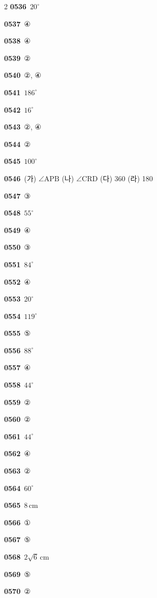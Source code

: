 \documentclass[10pt,a4paper]{article}
\newcommand{\pt}[1]{\mathrm{#1}}
\begin{document}
\begin{multicols}{2}
\noindent\textbf{0536}\ $20^\circ$\par
\noindent\textbf{0537}\ ④\par
\noindent\textbf{0538}\ ④\par
\noindent\textbf{0539}\ ②\par
\noindent\textbf{0540}\ ②, ④\par
\noindent\textbf{0541}\ $186^\circ$\par
\noindent\textbf{0542}\ $16^\circ$\par
\noindent\textbf{0543}\ ②, ④\par
\noindent\textbf{0544}\ ②\par
\noindent\textbf{0545}\ $100^\circ$\par
\noindent\textbf{0546}\ (가) $\angle\pt{APB}$ (나) $\angle\pt{CRD}$ (다) 360 (라) 180\par
\noindent\textbf{0547}\ ③\par
\noindent\textbf{0548}\ $55^\circ$\par
\noindent\textbf{0549}\ ④\par
\noindent\textbf{0550}\ ③\par
\noindent\textbf{0551}\ $84^\circ$\par
\noindent\textbf{0552}\ ④\par
\noindent\textbf{0553}\ $20^\circ$\par
\noindent\textbf{0554}\ $119^\circ$\par
\noindent\textbf{0555}\ ⑤\par
\noindent\textbf{0556}\ $88^\circ$\par
\noindent\textbf{0557}\ ④\par
\noindent\textbf{0558}\ $44^\circ$\par
\noindent\textbf{0559}\ ②\par
\noindent\textbf{0560}\ ②\par
\noindent\textbf{0561}\ $44^\circ$\par
\noindent\textbf{0562}\ ④\par
\noindent\textbf{0563}\ ②\par
\noindent\textbf{0564}\ $60^\circ$\par
\noindent\textbf{0565}\ $8\,\mathrm{cm}$\par
\noindent\textbf{0566}\ ①\par
\noindent\textbf{0567}\ ⑤\par
\noindent\textbf{0568}\ $2\sqrt{6}\,\mathrm{cm}$\par
\noindent\textbf{0569}\ ⑤\par
\noindent\textbf{0570}\ ②\par

\end{multicols}
\end{document}
